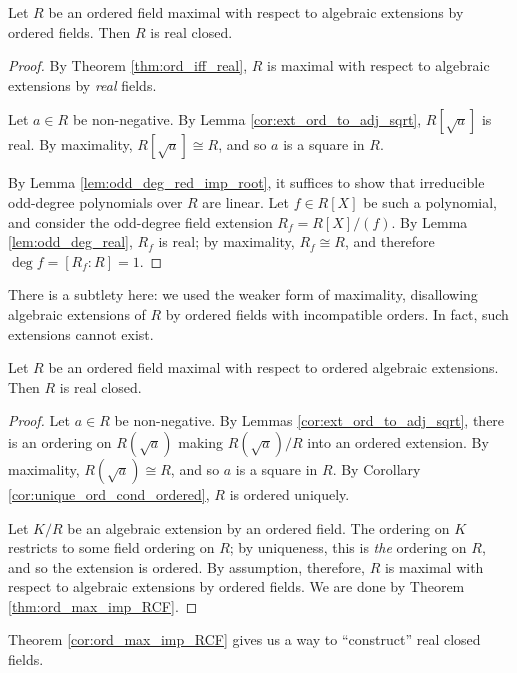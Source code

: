 \begin{theorem}
  \label{thm:ord_max_imp_RCF}
  Let $R$ be an ordered field maximal with respect to algebraic extensions by ordered fields. Then $R$ is real closed.
\end{theorem}
\begin{proof}
  By Theorem \ref{thm:ord_iff_real}, $R$ is maximal with respect to algebraic extensions by \textit{real} fields.

  Let $a\in R$ be non-negative. By Lemma \ref{cor:ext_ord_to_adj_sqrt}, $R[\sqrt{a}]$ is real. By maximality, $R[\sqrt{a}]\cong R$, and so $a$ is a square in $R$.

  By Lemma \ref{lem:odd_deg_red_imp_root}, it suffices to show that irreducible odd-degree polynomials over $R$ are linear. Let $f\in R[X]$ be such a polynomial, and consider the odd-degree field extension $R_f=R[X]/(f)$. By Lemma \ref{lem:odd_deg_real}, $R_f$ is real; by maximality, $R_f\cong R$, and therefore $\deg f=[R_f:R]=1$.
\end{proof}

There is a subtlety here: we used the weaker form of maximality, disallowing algebraic extensions of $R$ by ordered fields with incompatible orders. In fact, such extensions cannot exist.

\begin{corollary}
  \label{cor:ord_max_imp_RCF_strong}
  Let $R$ be an ordered field maximal with respect to ordered algebraic extensions. Then $R$ is real closed.
\end{corollary}
\begin{proof}
  Let $a\in R$ be non-negative. By Lemmas \ref{cor:ext_ord_to_adj_sqrt}, there is an ordering on $R(\sqrt{a})$ making $R(\sqrt{a})/R$ into an ordered extension. By maximality, $R(\sqrt{a})\cong R$, and so $a$ is a square in $R$. By Corollary \ref{cor:unique_ord_cond_ordered}, $R$ is ordered uniquely.

  Let $K/R$ be an algebraic extension by an ordered field. The ordering on $K$ restricts to some field ordering on $R$; by uniqueness, this is \textit{the} ordering on $R$, and so the extension is ordered. By assumption, therefore, $R$ is maximal with respect to algebraic extensions by ordered fields. We are done by Theorem \ref{thm:ord_max_imp_RCF}.
\end{proof}

Theorem \ref{cor:ord_max_imp_RCF} gives us a way to ``construct'' real closed fields.

